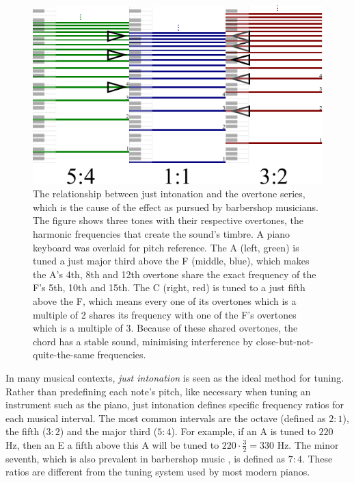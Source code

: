 \documentclass[a4paper]{article}
\begin{document}
\begin{figure}
	\centering
	\includegraphics[height=0.35\textheight]{Figures/overtones.pdf}
	\caption{The relationship between just intonation and the overtone series, which is the cause of the  effect as pursued by barbershop musicians. The figure shows three tones with their respective overtones, the harmonic frequencies that create the sound's timbre. A piano keyboard was overlaid for pitch reference. The A (left, green) is tuned a just major third above the F (middle, blue), which makes the A's 4th, 8th and 12th overtone share the exact frequency of the F's 5th, 10th and 15th. The C (right, red) is tuned to a just fifth above the F, which means every one of its overtones which is a multiple of 2 shares its frequency with one of the F's overtones which is a multiple of 3. Because of these shared overtones, the chord has a stable sound, minimising interference by close-but-not-quite-the-same frequencies.}
	\label{fig:overtones}
\end{figure}

In many musical contexts, {\it just intonation} is seen as the ideal method for tuning. \cite{boyden_prelleur_1951} Rather than predefining each note's pitch, like necessary when tuning an instrument such as the piano, just intonation defines specific frequency ratios for each musical interval. The most common intervals are the octave (defined as $2:1$), the fifth ($3:2$) and the major third ($5:4$). For example, if an A is tuned to $220$ Hz, then an E a fifth above this A will be tuned to $220 \cdot \frac32 = 330$ Hz. The minor seventh, which is also prevalent in barbershop music \cite{barbershop_harmony_society_contest_2022}, is defined as $7:4$. \cite{van_de_craats_fis_1989} These ratios are different from the tuning system used by most modern pianos.
\end{document}
